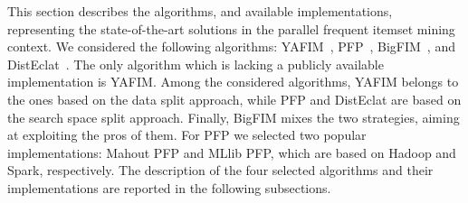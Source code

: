 \documentclass[preprint,review,12pt]{elsarticle}
\begin{document}
This section describes the algorithms, and available implementations, representing the state-of-the-art
solutions in the parallel frequent itemset mining context. We considered the following algorithms: YAFIM~\cite{YAFIM},
PFP~\cite{pfpgrowth},
BigFIM~\cite{bigfim}, and DistEclat~\cite{bigfim}.
The only algorithm which is lacking a publicly available implementation is YAFIM.
Among the considered algorithms, YAFIM belongs to the ones based on the data split approach, 
while PFP and DistEclat are based on the search space split approach. Finally, BigFIM mixes the two strategies, aiming at exploiting the pros of them.
For PFP we selected two popular implementations: Mahout PFP and MLlib PFP, which are based on Hadoop and Spark, respectively.  
The description of the four selected algorithms and their implementations are reported in the following subsections.

\end{document}

